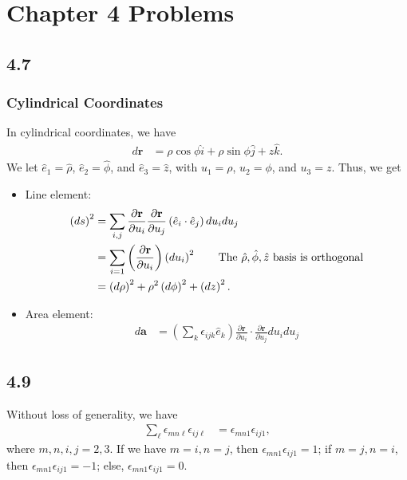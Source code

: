 \documentclass[10pt]{mypackage}
\begin{document}
\RaggedRight

\section{Chapter 4 Problems}%
\subsection{4.7}%
\subsubsection{Cylindrical Coordinates}%
In cylindrical coordinates, we have
\begin{align*}
  d\mathbf{r} &= \rho \cos \phi \hat{i} + \rho \sin\phi \hat{j} + z\hat{k}.
\end{align*}
We let $\hat{e}_1 = \hat{\rho}$, $\hat{e}_2 = \hat{\phi}$, and $\hat{e}_3 = \hat{z}$, with $u_1 = \rho$, $u_2 = \phi$, and $u_3 = z$. Thus, we get
\begin{itemize}
  \item Line element:
    \begin{align*}
      \left(ds\right)^2 &= \sum_{i,j} \frac{\partial \mathbf{r}}{\partial u_i} \frac{\partial \mathbf{r}}{\partial u_j}\left(\hat{e}_i \cdot \hat{e}_j\right) du_idu_j\\
                        &= \sum_{i=1}\left(\frac{\partial \mathbf{r}}{\partial u_i}\right) \left(du_i\right)^2\tag*{The $\hat{\rho},\hat{\phi},\hat z$ basis is orthogonal}\\
                        &= \left(d\rho\right)^2 + \rho^2 \left(d\phi\right)^2 + \left(dz\right)^2.
    \end{align*}
  \item Area element:
    \begin{align*}
      d\mathbf{a} &= \left(\sum_{k}\epsilon_{ijk}\hat{e}_k\right)\frac{\partial \mathbf{r}}{\partial u_i}\cdot\frac{\partial \mathbf{r}}{\partial u_j} du_i du_j
    \end{align*}
\end{itemize}
\subsection{4.9}%
Without loss of generality, we have
\begin{align*}
  \sum_{\ell}\epsilon_{mn\ell}\epsilon_{ij\ell} &= \epsilon_{mn1}\epsilon_{ij1},
\end{align*}
where $m,n,i,j = 2,3$. If we have $m=i,n=j$, then $\epsilon_{mn1}\epsilon_{ij1} = 1$; if $m=j,n=i$, then $\epsilon_{mn1}\epsilon_{ij1} = -1$; else, $\epsilon_{mn1}\epsilon_{ij1} = 0$.
\end{document}
